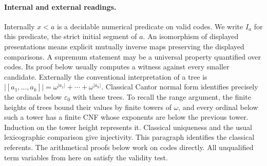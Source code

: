 \paragraph{Internal and external readings.}
Internally $x<a$ is a decidable numerical predicate on valid codes. We write $I_a$ for this predicate, the strict initial segment of $a$. An isomorphism of displayed presentations means explicit mutually inverse maps preserving the displayed comparisons. A supremum statement may be a universal property quantified over codes. Its proof below usually computes a witness against every smaller candidate. Externally the conventional interpretation of a tree is $|[a_1,\ldots,a_k]|=\omega^{|a_1|}+\cdots+\omega^{|a_k|}$. Classical Cantor normal form identifies precisely the ordinals below $\varepsilon_0$ with these trees. To recall the range argument, the finite heights of trees bound their values by finite towers of $\omega$, and every ordinal below such a tower has a finite CNF whose exponents are below the previous tower. Induction on the tower height represents it. Classical uniqueness and the usual lexicographic comparison give injectivity. This paragraph identifies the classical referents. The arithmetical proofs below work on codes directly. All unqualified term variables from here on satisfy the validity test.

